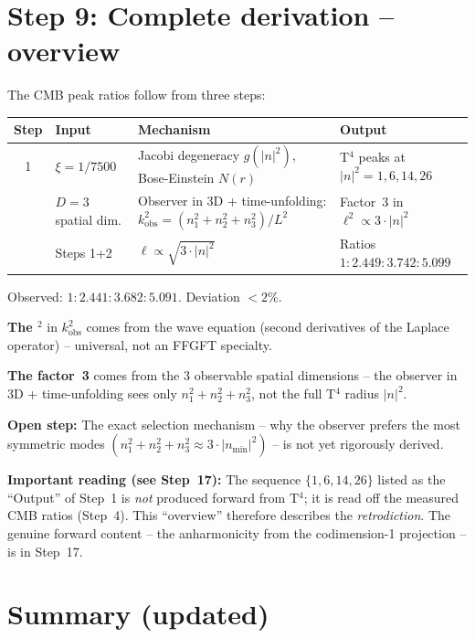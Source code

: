 \section{Step 9: Complete derivation -- overview}

The CMB peak ratios follow from three steps:

\begin{center}
\begin{tabular}{c p{2.1cm} p{6.3cm} p{3.8cm}}
\toprule
Step & Input & Mechanism & Output \\
\midrule
1 & $\xi = 1/7500$ &
  Jacobi degeneracy $g(|n|^2)$, Bose-Einstein $N(r)$ &
  T$^4$ peaks at $|n|^2 = 1, 6, 14, 26$ \\
\addlinespace
2 & $D = 3$ spatial dim. &
  Observer in 3D + time-unfolding:
  $k_\mathrm{obs}^2 = (n_1^2+n_2^2+n_3^2)/L^2$ &
  Factor~3 in $\ell^2 \propto 3\cdot|n|^2$ \\
\addlinespace
3 & Steps 1+2 &
  $\ell \propto \sqrt{3\cdot|n|^2}$ &
  Ratios $1:2{.}449:3{.}742:5{.}099$ \\
\bottomrule
\end{tabular}
\end{center}

Observed: $1:2{.}441:3{.}682:5{.}091$. Deviation $< 2\%$.

\textbf{The $^2$} in $k_\mathrm{obs}^2$ comes from the wave equation
(second derivatives of the Laplace operator) -- universal, not an FFGFT specialty.

\textbf{The factor~3} comes from the 3 observable spatial dimensions --
the observer in 3D + time-unfolding sees only $n_1^2+n_2^2+n_3^2$,
not the full T$^4$ radius $|n|^2$.

\textbf{Open step:} The exact selection mechanism --
why the observer prefers the most symmetric modes
$(n_1^2+n_2^2+n_3^2 \approx 3\cdot|n_\mathrm{min}|^2)$ --
is not yet rigorously derived.

\textbf{Important reading (see Step~17):} The sequence $\{1,6,14,26\}$ listed
as the ``Output'' of Step~1 is \emph{not} produced forward from T$^4$; it is
read off the measured CMB ratios (Step~4). This ``overview'' therefore
describes the \emph{retrodiction}. The genuine forward content -- the
anharmonicity from the codimension-1 projection -- is in Step~17.

\section{Summary (updated)}

